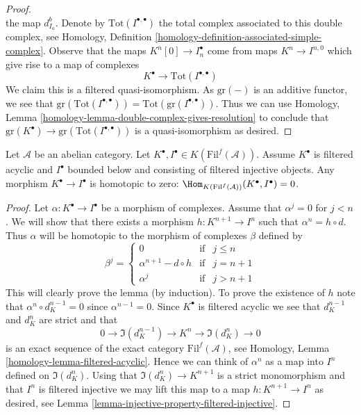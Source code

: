 \begin{proof}
$$$$
the map $d_{I_a}^b$. Denote by $\text{Tot}(I^{\bullet, \bullet})$
the total complex associated to this double complex, see
Homology, Definition \ref{homology-definition-associated-simple-complex}.
Observe that the maps $K^n[0] \to I_n^\bullet$ come from maps
$K^n \to I^{n, 0}$ which give rise to a map of complexes
$$
K^\bullet \longrightarrow \text{Tot}(I^{\bullet, \bullet})
$$
We claim this is a filtered quasi-isomorphism.
As $\text{gr}(-)$ is an additive functor, we see that
$\text{gr}(\text{Tot}(I^{\bullet, \bullet})) =
\text{Tot}(\text{gr}(I^{\bullet, \bullet}))$.
Thus we can use
Homology,
Lemma \ref{homology-lemma-double-complex-gives-resolution}
to conclude that
$\text{gr}(K^\bullet) \to \text{gr}(\text{Tot}(I^{\bullet, \bullet}))$
is a quasi-isomorphism as desired.
\end{proof}

\begin{lemma}
\label{lemma-filtered-acyclic-is-zero}
Let $\mathcal{A}$ be an abelian category.
Let $K^\bullet, I^\bullet \in K(\text{Fil}^f(\mathcal{A}))$.
Assume $K^\bullet$ is filtered acyclic and
$I^\bullet$ bounded below and consisting of filtered injective objects.
Any morphism $K^\bullet \to I^\bullet$ is homotopic to zero:
$\Hom_{K(\text{Fil}^f(\mathcal{A}))}(K^\bullet, I^\bullet) = 0$.
\end{lemma}

\begin{proof}
Let $\alpha : K^\bullet \to I^\bullet$ be a morphism of
complexes. Assume that $\alpha^j = 0$ for $j < n$.
We will show that there exists a morphism $h : K^{n + 1} \to I^n$
such that $\alpha^n = h \circ d$. Thus $\alpha$ will be homotopic
to the morphism of complexes $\beta$ defined by
$$
\beta^j =
\left\{
\begin{matrix}
0 & \text{if} & j \leq n \\
\alpha^{n + 1} - d \circ h & \text{if} & j = n + 1 \\
\alpha^j & \text{if} & j > n + 1
\end{matrix}
\right.
$$
This will clearly prove the lemma (by induction).
To prove the existence of $h$ note that
$\alpha^n \circ d_K^{n - 1} = 0$ since
$\alpha^{n - 1} = 0$. Since $K^\bullet$ is filtered acyclic
we see that $d_K^{n - 1}$ and $d_K^n$ are strict and that
$$
0 \to \Im(d_K^{n - 1}) \to K^n \to \Im(d_K^n) \to 0
$$
is an exact sequence of the exact category $\text{Fil}^f(\mathcal{A})$, see
Homology, Lemma \ref{homology-lemma-filtered-acyclic}.
Hence we can think of $\alpha^n$ as a map into $I^n$ defined
on $\Im(d_K^n)$.
Using that $\Im(d_K^n) \to K^{n + 1}$ is a strict monomorphism
and that $I^n$ is filtered injective we may lift this map to a map
$h : K^{n + 1} \to I^n$ as desired, see
Lemma \ref{lemma-injective-property-filtered-injective}.
\end{proof}

